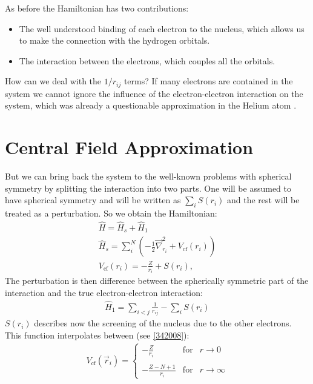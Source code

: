 \documentclass[10pt]{article}
\let\cite\citep
\providecommand\citep{\cite}
\begin{document}
As before the Hamiltonian has two contributions:
\begin{itemize}
\item The well understood binding of each electron to the nucleus, which allows us to make the connection with the hydrogen orbitals.
\item The interaction between the electrons, which couples all the orbitals.
\end{itemize}

How can we deal with the $1/r_{ij}$ terms?  If many electrons are contained in the system we cannot ignore the influence of the electron-electron interaction on the system, which was already a questionable approximation in the Helium atom \cite{Jendrzejewskib}.

\section{Central Field Approximation}

 But we can bring back the system to the well-known problems with spherical symmetry by splitting the interaction into two parts. One will be assumed to have spherical symmetry and will be written as $\sum_i S(r_i)$ and the rest will be treated as a perturbation. So we obtain the Hamiltonian:
\begin{align}
\hat{H} = \hat{H}_s + \hat{H}_1\\
\hat{H}_s = \sum_i^N \left(-\frac{1}{2} \vec{\nabla}^2_{r_i} + V_\textrm{cf}(r_i) \right)\\
V_\textrm{cf} (r_i) = - \frac{Z}{r_i} + S(r_i),
\end{align}
The perturbation is then difference between the spherically symmetric part of the interaction and the true electron-electron interaction:
\begin{align}
\hat{H}_1 = \sum_{i<j} \frac{1}{r_{ij}} - \sum_i S(r_i)
\end{align}
$S(r_i)$ describes now the screening of the nucleus due to the other electrons. This function interpolates between (see \ref{342008}):
\begin{align}
V_\textrm{cf} (\vec{r}_i) = \left\{ \begin{array}{ccc} -\frac{Z}{r_i} &\text{for}& r\to 0 \\ \\ -\frac{Z-N+1}{r_i} & \text{for} & r\to\infty  \end{array} \right.
\end{align}
\end{document}
